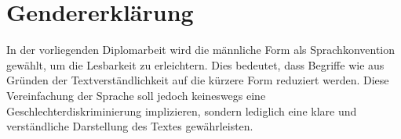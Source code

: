 \section{Gendererklärung}

In der vorliegenden Diplomarbeit wird die männliche Form als Sprachkonvention gewählt, um die Lesbarkeit zu erleichtern. Dies bedeutet, dass Begriffe wie  aus Gründen der Textverständlichkeit auf die kürzere Form  reduziert werden. Diese Vereinfachung der Sprache soll jedoch keineswegs eine Geschlechterdiskriminierung implizieren, sondern lediglich eine klare und verständliche Darstellung des Textes gewährleisten.